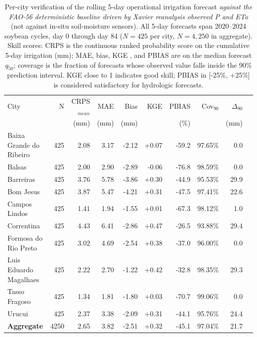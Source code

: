 \begin{table}[t]
\centering
\caption{Per-city verification of the rolling 5-day operational irrigation forecast \emph{against the FAO-56 deterministic baseline driven by Xavier reanalysis observed P and ETo} (not against in-situ soil-moisture sensors). All 5-day forecasts span 2020--2024 soybean cycles, day 0 through day 84 (\(N = 425\) per city, \(N = 4{,}250\) in aggregate). Skill scores: CRPS is the continuous ranked probability score on the cumulative 5-day irrigation (mm); MAE, bias, KGE \citep{Kling2012}, and PBIAS \citep{Moriasi2007} are on the median forecast \(q_{50}\); coverage is the fraction of forecasts whose observed value falls inside the 90\% prediction interval. KGE close to 1 indicates good skill; PBIAS in [-25\%, +25\%] is considered satisfactory for hydrologic forecasts.}
\label{tab:backtest-rolling}
\begin{tabular}{lrrrrrrrrr}
\toprule
City & N & CRPS$_{mean}$ & MAE & Bias & KGE & PBIAS & Cov$_{90}$ & $\Delta_{90}$ \\
 & & (mm) & (mm) & (mm) & & (\%) & & (mm) \\
\midrule
Baixa Grande do Ribeiro & 425 & 2.08 & 3.17 & -2.12 & +0.07 & -59.2 & 97.65\% & 0.0 \\
Balsas & 425 & 2.00 & 2.90 & -2.89 & -0.06 & -76.8 & 98.59\% & 0.0 \\
Barreiras & 425 & 3.76 & 5.78 & -3.86 & +0.30 & -44.9 & 95.53\% & 29.9 \\
Bom Jesus & 425 & 3.87 & 5.47 & -4.21 & +0.31 & -47.5 & 97.41\% & 22.6 \\
Campos Lindos & 425 & 1.41 & 1.94 & -1.55 & +0.01 & -67.3 & 98.12\% & 1.0 \\
Correntina & 425 & 4.43 & 6.41 & -2.86 & +0.47 & -26.5 & 93.88\% & 29.4 \\
Formosa do Rio Preto & 425 & 3.02 & 4.69 & -2.54 & +0.38 & -37.0 & 96.00\% & 0.0 \\
Luis Eduardo Magalhaes & 425 & 2.22 & 2.70 & -1.22 & +0.42 & -32.8 & 98.35\% & 29.3 \\
Tasso Fragoso & 425 & 1.34 & 1.81 & -1.80 & +0.03 & -70.7 & 99.06\% & 0.0 \\
Urucui & 425 & 2.37 & 3.38 & -2.09 & +0.31 & -44.1 & 95.76\% & 24.4 \\
\midrule
\textbf{Aggregate} & 4250 & 2.65 & 3.82 & -2.51 & +0.32 & -45.1 & 97.04\% & 21.7 \\
\bottomrule
\end{tabular}
\end{table}